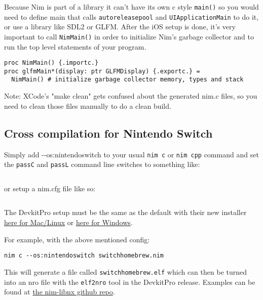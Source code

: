 Because Nim is part of a library it can't have its own c style
\texttt{main()} so you would need to define {main} that calls
\texttt{autoreleasepool} and \texttt{UIApplicationMain} to do it, or use
a library like SDL2 or GLFM. After the iOS setup is done, it's very
important to call \texttt{NimMain()} in order to initialize Nim's
garbage collector and to run the top level statements of your program.

\begin{verbatim}
proc NimMain() {.importc.}
proc glfmMain*(display: ptr GLFMDisplay) {.exportc.} =
  NimMain() # initialize garbage collector memory, types and stack
\end{verbatim}

Note: XCode's "make clean" gets confused about the generated nim.c
files, so you need to clean those files manually to do a clean build.

\hypertarget{cross-compilation-for-nintendo-switch}{%
\subsection{Cross compilation for Nintendo
Switch}\label{cross-compilation-for-nintendo-switch}}

Simply add -\/-os:nintendoswitch to your usual \texttt{nim\ c} or
\texttt{nim\ cpp} command and set the \texttt{passC} and \texttt{passL}
command line switches to something like:

\begin{verbatim}
\end{verbatim}

or setup a nim.cfg file like so:

\begin{verbatim}
\end{verbatim}

The DevkitPro setup must be the same as the default with their new
installer \href{https://github.com/devkitPro/pacman/releases}{here for
Mac/Linux} or
\href{https://github.com/devkitPro/installer/releases}{here for
Windows}.

For example, with the above mentioned config:

\begin{verbatim}
nim c --os:nintendoswitch switchhomebrew.nim
\end{verbatim}

This will generate a file called \texttt{switchhomebrew.elf} which can
then be turned into an nro file with the \texttt{elf2nro} tool in the
DevkitPro release. Examples can be found at
\href{https://github.com/jyapayne/nim-libnx.git}{the nim-libnx github
repo}.

